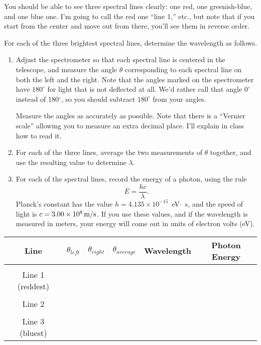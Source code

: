 You should be able to see three spectral lines clearly: one red,
one greenish-blue, and one blue one. I'm going to call the red one
``line 1,'' etc., but note that if you start from the center and
move out from there, you'll see them in reverse order.

For each of the three brightest spectral lines, determine
the wavelength as follows.  

\begin{enumerate}
\item Adjust the spectrometer so that each spectral
line is centered in the telescope, and measure the angle $\theta$
corresponding to each spectral line on both the left and the right.
Note that the angles marked on the spectrometer have $180^\circ$
for light that is not deflected at all.  We'd rather
call that angle $0^\circ$ instead of 180$^\circ$, so you should
subtract $180^\circ$ from your angles.

Measure the angles as accurately as possible.  Note that there is 
a ``Vernier scale'' allowing you to measure an extra decimal place.
I'll explain in class how to read it.

\pagebreak[3]

\item For each of the three lines, average the two measurements of
$\theta$ together, and use the resulting value to determine $\lambda$.

\item For each of the spectral lines, record the energy of a photon,
using the rule 
$$
E=\frac{hc}{\lambda}.
$$
Planck's constant has the value $h=4.135\times 10^{-15}$~eV$\cdot$~s, and
the speed of light is $c=3.00\times 10^8\,{\rm m/s}$.  If you use these
values, and if the wavelength is measured in meters, your energy
will come out in units of electron volts (eV).
\end{enumerate}


\begin{center}
\begin{tabular}{|c|c|c|c|c|c|}\hline
Line        & $\theta_{left}$     & $\theta_{right}$     & $\theta_{average}$ & Wavelength  & Photon Energy \\ 
\hline
& & & & & \\
Line 1 (reddest)  &                             &                              &                    &                    &   \\ \hline
& & & & & \\
Line 2   &                             &                              &                    &                    &   \\ \hline
& & & & & \\
Line 3 (bluest)  &                             &                              &                    &                    &   \\ \hline
\end{tabular}
\end{center}

